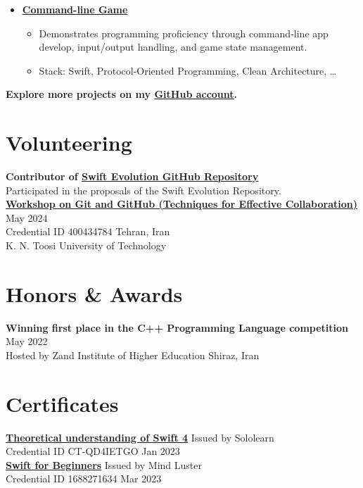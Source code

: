 \documentclass[letter,12pt]{article}
\newcommand{\customsquare}{\raisebox{0.25ex}{\scalebox{0.45}{$\blacksquare$}}}
\begin{document}
\begin{itemize}[label={\customsquare}]
    \item \href{https://github.com/nsswifter/CommandLineGameh}{\underline{\textbf{Command-line Game}}}
    \begin{itemize}
        \item Demonstrates programming proficiency through command-line app develop, input/output handling, and game state management.
        \item Stack: Swift, Protocol-Oriented Programming, Clean Architecture, …
    \end{itemize}
\end{itemize}

\small \textbf{Explore more projects on my \href{https://github.com/nsswifter}{\underline{GitHub account}}.}

\section*{Volunteering}
\textbf{Contributor of \href{https://github.com/swiftlang/swift-evolution}{\underline{\textbf{Swift Evolution GitHub Repository}}}} \\ [5pt]
Participated in the proposals of the Swift Evolution Repository. \\ [15pt]
\href{https://github.com/nsswifter/CV/blob/main/Assets/certificate-of-workshop-participation-karami-mehdi.pdf}{\underline{\textbf{Workshop on Git and GitHub (Techniques for Effective Collaboration)}}} \hfill May 2024 \\ [5pt]
Credential ID 400434784 \hfill Tehran, Iran \\ [5pt]
K. N. Toosi University of Technology

\pagebreak

\section*{Honors \& Awards}
\noindent
\textbf{Winning first place in the C++ Programming Language competition} \hfill May 2022 \\ [5pt]
Hosted by Zand Institute of Higher Education \hfill Shiraz, Iran

\vspace{5mm} %

\section*{Certificates}
\noindent
\href{https://www.sololearn.com/certificate/CT-QD4IETGO/png}{\underline{\textbf{Theoretical understanding of Swift 4}}} \hfill Issued by Sololearn \\ [5pt]
Credential ID CT-QD4IETGO \hfill Jan 2023 \\ [15pt]
\href{https://www.mindluster.com/storage/cer/1688271634.jpg}{\underline{\textbf{Swift for Beginners}}} \hfill Issued by Mind Luster \\ [5pt]
Credential ID 1688271634 \hfill Mar 2023
\end{document}
